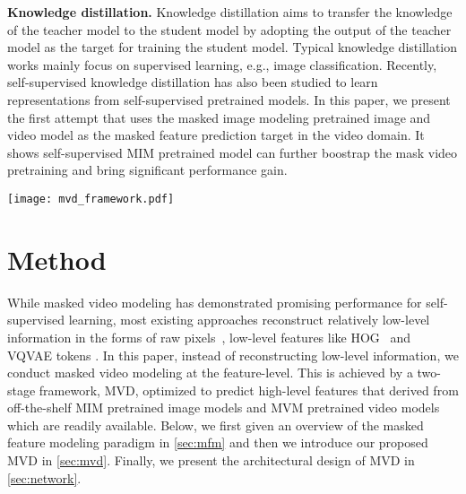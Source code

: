 \documentclass[10pt,twocolumn,letterpaper]{article}
\makeatletter
\newcommand*{\system}{MVD\@\xspace}
\makeatother
\begin{document}
\vspace{0.05in}
\noindent\textbf{Knowledge distillation.} Knowledge distillation \cite{hinton2015distilling,phuong2019towards,gou2021knowledge} aims to transfer the knowledge of the teacher model to the student model by adopting the output of the teacher model as the target for training the student model. Typical knowledge distillation works \cite{hinton2015distilling,shen2021fast,shen2020meal} mainly focus on supervised learning, e.g., image classification. Recently, self-supervised knowledge distillation \cite{xu2020knowledge,fang2021seed,xu2021bag} has also been studied  to learn representations from self-supervised pretrained models. In this paper, we present the first attempt that uses the masked image modeling pretrained image and video model as the masked feature prediction target in the video domain. It shows self-supervised MIM pretrained model can further boostrap the mask video pretraining and bring significant performance gain. 



 \begin{figure*}[t]
\begin{center}
   \texttt{[image: mvd\_framework.pdf]}
\end{center}
   \vspace{-0.2in}
   \caption{\textbf{An overview of MVD framework.} Firstly the image teacher is pretrained by masked image modeling and the video teacher is pretrained by masked video modeling. Then the student model is trained from scratch to predict target high-level features encoded by the image teacher and the video teacher. The teacher models are fixed in the distillation stage.}
\label{fig:framework}
\vspace{-10pt}
\end{figure*}

\section{Method}
While masked video modeling has demonstrated promising performance for self-supervised learning, most existing approaches reconstruct relatively low-level information in the forms of raw pixels~\cite{tong2022videomae}, low-level features like HOG~\cite{maskfeat} and VQVAE tokens \cite{wang2022bevt}. In this paper, instead of reconstructing low-level information, we conduct masked video modeling at the feature-level. This is achieved by a two-stage framework, \system, optimized to predict high-level features that derived from off-the-shelf MIM pretrained image models \cite{he2021masked} and MVM pretrained video models \cite{tong2022videomae} which are readily available. Below, we first given an overview of the masked feature modeling paradigm in \cref{sec:mfm} and then we introduce our proposed \system in \cref{sec:mvd}. Finally, we present the architectural design of \system in \cref{sec:network}.
\end{document}
